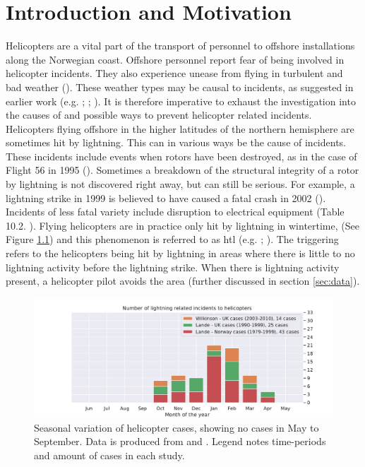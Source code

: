 \chapter{Introduction and Motivation}\label{ch:introduction}

Helicopters are a vital part of the transport of personnel to offshore installations along the Norwegian coast. Offshore personnel report fear of being involved in helicopter incidents. They also experience unease from flying in turbulent and bad weather (\cite{wasilewska2019}). These weather types may be causal to incidents, as suggested in earlier work (e.g. \cite{lande1999}; \cite{wilkinson2013}; \cite{smart1997}). It is therefore imperative to exhaust the investigation into the causes of and possible ways to prevent helicopter related incidents. 
Helicopters flying offshore in the higher latitudes of the northern hemisphere are sometimes hit by lightning. This can in various ways be the cause of incidents. These incidents include events when rotors have been destroyed, as in the case of Flight 56 in 1995 (\cite{smart1997}). Sometimes a breakdown of the structural integrity of a rotor by lightning is not discovered right away, but can still be serious. For example, a lightning strike in 1999 is believed to have caused a fatal crash in 2002 (\cite{smart2005}). Incidents of less fatal variety include disruption to electrical equipment (Table 10.2. \cite{rakovBok}). Flying helicopters are in practice only hit by lightning in wintertime, (See Figure \ref{fig:landewilk}) and this phenomenon is referred to as \acrfull{htl} (e.g. \cite{lande1999}; \cite{wilkinson2013}). The triggering refers to the helicopters being hit by lightning in areas where there is little to no lightning activity before the lightning strike. When there is lightning activity present, a helicopter pilot avoids the area (further discussed in section \ref{sec:data}).


\begin{figure}
    \centering
    \includegraphics[width=\textwidth]{Figures/yearlydistribution_withoutmine.pdf}
    \caption{Seasonal variation of helicopter cases, showing no cases in May to September. Data is produced from \cite{lande1999} and \cite{wilkinson2013}. Legend notes time-periods and amount of cases in each study.}
    \label{fig:landewilk}
\end{figure}

